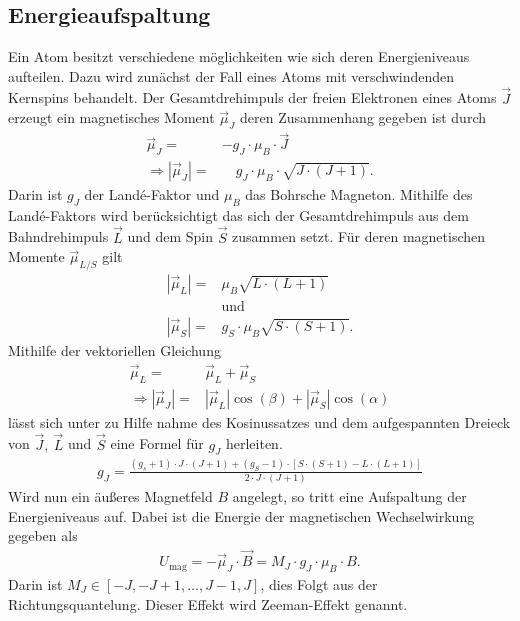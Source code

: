 \subsection{Energieaufspaltung}
Ein Atom besitzt verschiedene möglichkeiten wie sich deren Energieniveaus aufteilen. Dazu wird zunächst der Fall eines Atoms mit verschwindenden Kernspins behandelt.
Der Gesamtdrehimpuls der freien Elektronen eines Atoms $\vec{J}$ erzeugt ein magnetisches Moment $\vec{\mu}_J $ deren Zusammenhang gegeben ist durch
\begin{align}
	\vec{\mu}_J=&-g_J \cdot \mu_B \cdot \vec{J}\\
	\Rightarrow |\vec{\mu}_J|=&\hspace{1em} g_J\cdot\mu_B\cdot\sqrt{J\cdot(J+1)}.
\end{align}
Darin ist $g_J$ der Landé-Faktor und $\mu_B$ das Bohrsche Magneton.
Mithilfe des Landé-Faktors wird berücksichtigt das sich der Gesamtdrehimpuls aus dem Bahndrehimpuls $\vec{L}$ und dem Spin $\vec{S}$ zusammen setzt.
Für deren magnetischen Momente $\vec{\mu}_{L/S}$ gilt 
\begin{align}
	|\vec{\mu}_L|=&\mu_B\sqrt{L\cdot(L+1)}\\
	&\text{und}\nonumber\\
	|\vec{\mu}_S|=& g_S\cdot\mu_B\sqrt{S\cdot(S+1)}.
\end{align}
Mithilfe der vektoriellen Gleichung
\begin{align}
	\vec{\mu}_L=&\vec{\mu}_L+\vec{\mu}_S\\
	\Rightarrow |\vec{\mu}_J|=&|\vec{\mu}_L|\cos(\beta)+|\vec{\mu}_S|\cos(\alpha)
\end{align}
lässt sich unter zu Hilfe nahme des Kosinussatzes und dem aufgespannten Dreieck von $\vec{J},\ \vec{L}$ und $\vec{S}$ eine Formel für $g_J$ herleiten.
\begin{align}
	g_J =\frac{(g_s + 1)\cdot J \cdot (J+1)+(g_S-1)\cdot\left[S\cdot(S+1)-L\cdot(L+1)\right]}{2\cdot J \cdot (J+1)}
	\label{eq:lande_faktor_gj}
\end{align}
Wird nun ein äußeres Magnetfeld $B$ angelegt, so tritt eine Aufspaltung der Energieniveaus auf.
Dabei ist die Energie der magnetischen Wechselwirkung gegeben als 
\begin{align}
	U_{\text{mag}}=-\vec{\mu}_J\cdot \vec{B}=M_J\cdot g_J\cdot \mu_B\cdot B.\label{eq:magEnergie}
\end{align}
Darin ist $M_J\in[-J, -J+1,\hdots,J-1,J]$, dies Folgt aus der Richtungsquantelung.
Dieser Effekt wird Zeeman-Effekt genannt.
